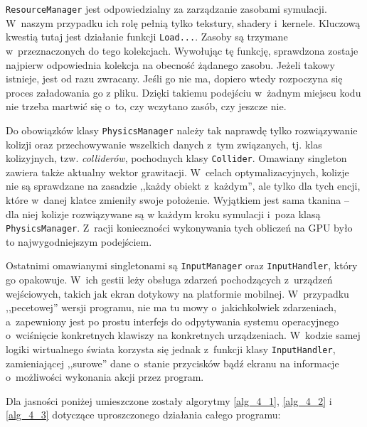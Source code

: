 	\texttt{ResourceManager} jest odpowiedzialny za zarządzanie zasobami symulacji. W~naszym przypadku ich rolę pełnią tylko tekstury, shadery i~kernele. Kluczową kwestią tutaj jest działanie funkcji \texttt{Load...}. Zasoby są trzymane w~przeznaczonych do tego kolekcjach. Wywołując tę funkcję, sprawdzona zostaje najpierw odpowiednia kolekcja na obecność żądanego zasobu. Jeżeli takowy istnieje, jest od razu zwracany. Jeśli go nie ma, dopiero wtedy rozpoczyna się proces załadowania go z pliku. Dzięki takiemu podejściu w~żadnym miejscu kodu nie trzeba martwić się o~to, czy wczytano zasób, czy jeszcze nie.
	
	Do obowiązków klasy \texttt{PhysicsManager} należy tak naprawdę tylko rozwiązywanie kolizji oraz przechowywanie wszelkich danych z~tym związanych, tj. klas kolizyjnych, tzw. \emph{colliderów}, pochodnych klasy \texttt{Collider}. Omawiany singleton zawiera także aktualny wektor grawitacji. W~celach optymalizacyjnych, kolizje nie są sprawdzane na zasadzie ,,każdy obiekt z~każdym'', ale tylko dla tych encji, które w~danej klatce zmieniły swoje położenie. Wyjątkiem jest sama tkanina -- dla niej kolizje rozwiązywane są w każdym kroku symulacji i~poza klasą \texttt{PhysicsManager}. Z~racji konieczności wykonywania tych obliczeń na GPU było to najwygodniejszym podejściem.
	
	Ostatnimi omawianymi singletonami są \texttt{InputManager} oraz \texttt{InputHandler}, który go opakowuje. W~ich gestii leży obsługa zdarzeń pochodzących z~urządzeń wejściowych, takich jak ekran dotykowy na platformie mobilnej. W~przypadku ,,pecetowej'' wersji programu, nie ma tu mowy o~jakichkolwiek zdarzeniach, a~zapewniony jest po prostu interfejs do odpytywania systemu operacyjnego o~wciśnięcie konkretnych klawiszy na konkretnych urządzeniach. W~kodzie samej logiki wirtualnego świata korzysta się jednak z~funkcji klasy \texttt{InputHandler}, zamieniającej ,,surowe'' dane o~stanie przycisków bądź ekranu na informacje o~możliwości wykonania akcji przez program.
	
	Dla jasności poniżej umieszczone zostały algorytmy \ref{alg_4_1}, \ref{alg_4_2} i \ref{alg_4_3} dotyczące uproszczonego działania całego programu:
	
